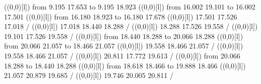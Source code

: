 {\linethickness=1pt
\setplotsymbol ({\makebox(0,0)[l]{\tencirc{}}})
{\color[rgb]{0,0,0}\putrule from  9.195 17.653 to  9.195 18.923
}%
%
%
\linethickness=1pt
\setplotsymbol ({\makebox(0,0)[l]{\tencirc{}}})
{\color[rgb]{0,0,0}\putrule from 16.002 19.101 to 16.002 17.501
}%
%
%
\linethickness=1pt
\setplotsymbol ({\makebox(0,0)[l]{\tencirc{}}})
{\color[rgb]{0,0,0}\putrule from 16.180 18.923 to 16.180 17.678
}%
%
%
\linethickness=1pt
\setplotsymbol ({\makebox(0,0)[l]{\tencirc{}}})
{\color[rgb]{0,0,0} 17.501 17.526 17.018 /
}%
%
%
\linethickness=1pt
\setplotsymbol ({\makebox(0,0)[l]{\tencirc{}}})
{\color[rgb]{0,0,0} 17.018 18.440 18.288 /
}%
%
%
\linethickness=1pt
\setplotsymbol ({\makebox(0,0)[l]{\tencirc{}}})
{\color[rgb]{0,0,0} 18.288 17.526 19.558 /
}%
%
%
\linethickness=1pt
\setplotsymbol ({\makebox(0,0)[l]{\tencirc{}}})
{\color[rgb]{0,0,0} 19.101 17.526 19.558 /
}%
%
%
\linethickness=1pt
\setplotsymbol ({\makebox(0,0)[l]{\tencirc{}}})
{\color[rgb]{0,0,0}\putrule from 18.440 18.288 to 20.066 18.288
}%
%
%
\linethickness=1pt
\setplotsymbol ({\makebox(0,0)[l]{\tencirc{}}})
{\color[rgb]{0,0,0}\putrule from 20.066 21.057 to 18.466 21.057
}%
%
%
\linethickness=1pt
\setplotsymbol ({\makebox(0,0)[l]{\tencirc{}}})
{\color[rgb]{0,0,0} 19.558 18.466 21.057 /
}%
%
%
\linethickness=1pt
\setplotsymbol ({\makebox(0,0)[l]{\tencirc{}}})
{\color[rgb]{0,0,0} 19.558 18.466 21.057 /
}%
%
%
\linethickness=1pt
\setplotsymbol ({\makebox(0,0)[l]{\tencirc{}}})
{\color[rgb]{0,0,0} 20.811 17.772 19.613 /
}%
%
%
\linethickness=1pt
\setplotsymbol ({\makebox(0,0)[l]{\tencirc{}}})
{\color[rgb]{0,0,0}\putrule from 20.066 18.288 to 18.440 18.288
}%
%
%
\linethickness=1pt
\setplotsymbol ({\makebox(0,0)[l]{\tencirc{}}})
{\color[rgb]{0,0,0}\putrule from 18.618 18.466 to 19.888 18.466
}%
%
%
\linethickness=1pt
\setplotsymbol ({\makebox(0,0)[l]{\tencirc{}}})
{\color[rgb]{0,0,0} 21.057 20.879 19.685 /
}%
%
%
\linethickness=1pt
\setplotsymbol ({\makebox(0,0)[l]{\tencirc{}}})
{\color[rgb]{0,0,0} 19.746 20.005 20.811 /
}}
